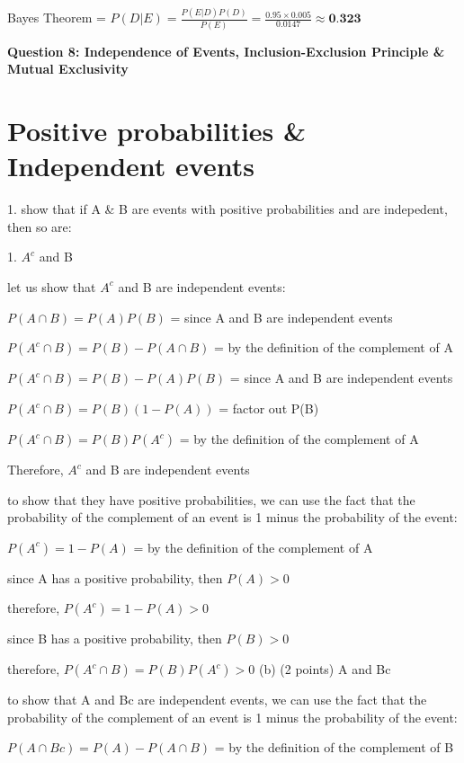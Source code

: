 \documentclass{article}
\begin{document}
Bayes Theorem = \(P(D|E) = \frac{P(E|D)P(D)}{P(E)} = \frac{0.95 \times 0.005}{0.0147} \approx \textbf{0.323}\)

\begin{center}
    \large \textbf{Question 8: Independence of Events, Inclusion-Exclusion Principle \& Mutual Exclusivity}
\end{center}

\section{Positive probabilities \& Independent events}
1. show that if A \& B are events with positive probabilities and are indepedent, then so are:

1. \(A^c\) and B 

let us show that \(A^c\) and B are independent events:

\(P(A \cap B) = P(A)P(B)\) = since A and B are independent events

\(P(A^c \cap B) = P(B) - P(A \cap B)\) = by the definition of the complement of A

\(P(A^c \cap B) = P(B) - P(A)P(B)\) = since A and B are independent events

\(P(A^c \cap B) = P(B)(1 - P(A))\) = factor out P(B)

\(P(A^c \cap B) = P(B)P(A^c)\) = by the definition of the complement of A

Therefore, \(A^c\) and B are independent events\newline

to show that they have positive probabilities, we can use the fact that the probability of the complement of an event is 1 minus the probability of the event:

\(P(A^c) = 1 - P(A)\) = by the definition of the complement of A

since A has a positive probability, then \(P(A) > 0\)

therefore, \(P(A^c) = 1 - P(A) > 0\)

since B has a positive probability, then \(P(B) > 0\)

therefore, \(P(A^c \cap B) = P(B)P(A^c) > 0\)   \newline
(b) (2 points) A and Bc

to show that A and Bc are independent events, we can use the fact that the probability of the complement of an event is 1 minus the probability of the event:

\(P(A \cap Bc) = P(A) - P(A \cap B)\) = by the definition of the complement of B
\end{document}
